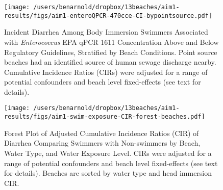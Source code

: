 \documentclass[11pt]{article}
\begin{document}
\clearpage
\begin{figure}[htbp]
\begin{center}
 \texttt{[image: /users/benarnold/dropbox/13beaches/aim1-results/figs/aim1-enteroQPCR-470cce-CI-bypointsource.pdf]} 
\begin{minipage}{\textwidth}
\caption{Incident Diarrhea Among Body Immersion Swimmers Associated with \textit{Enterococcus} EPA qPCR 1611 Concentration Above and Below Regulatory Guidelines, Stratified by Beach Conditions. Point source beaches had an identified source of human sewage discharge nearby. Cumulative Incidence Ratios (CIRs) were adjusted for a range of potential confounders and beach level fixed-effects (see text for details).}
\label{fig:enteroqpcrregulatory}
\end{minipage}
\end{center}
\end{figure}

\clearpage
\begin{figure}[htbp]
\begin{center}
 \texttt{[image: /users/benarnold/dropbox/13beaches/aim1-results/figs/aim1-swim-exposure-CIR-forest-beaches.pdf]} 
\begin{minipage}{\textwidth}
\caption{Forest Plot of Adjusted Cumulative Incidence Ratios (CIR) of Diarrhea Comparing Swimmers with Non-swimmers by Beach, Water Type, and Water Exposure Level. CIRs were adjusted for a range of potential confounders and beach level fixed-effects (see text for details). Beaches are sorted by water type and head immersion CIR.}
\label{fig:swimexforest}
\end{minipage}
\end{center}
\end{figure}
\end{document}
